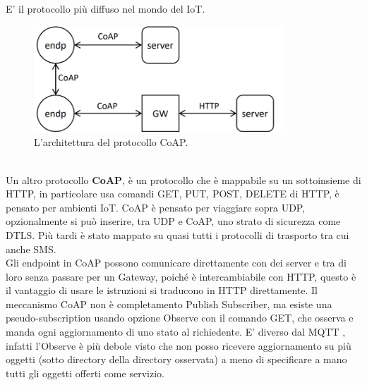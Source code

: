 \documentclass[11pt, twocolumn]{article}
\begin{document}
E' il protocollo più diffuso nel mondo del IoT.\\
\begin{figure}[!h]
  \centering
  \includegraphics[width=\linewidth,height=4cm]{imgs/coap.png}
  \caption{L'architettura del protocollo CoAP.}
  \label{fig:coap}
\end{figure}\\
Un altro protocollo \textbf{CoAP}, è un protocollo che è mappabile su un sottoinsieme di HTTP, in particolare usa comandi GET, PUT, POST, DELETE di HTTP, è pensato per ambienti IoT.
CoAP è pensato per viaggiare sopra UDP, opzionalmente si può inserire, tra UDP e CoAP, uno strato di sicurezza come DTLS.
Più tardi è stato mappato su quasi tutti i protocolli di trasporto tra cui anche SMS.\\
Gli endpoint in CoAP possono comunicare direttamente con dei server e tra di loro senza passare per un Gateway, poiché è intercambiabile con HTTP, questo è il vantaggio di usare le istruzioni si traducono in HTTP direttamente.
Il meccanismo CoAP non è completamento Publish Subscriber, ma esiste una pseudo-subscription usando opzione Observe con il comando GET, che osserva e manda ogni aggiornamento di uno stato al richiedente.
E' diverso dal MQTT , infatti l'Observe è più debole visto che non posso ricevere aggiornamento su più oggetti (sotto directory della directory osservata) a meno di specificare a mano tutti gli oggetti offerti come servizio.
\end{document}
